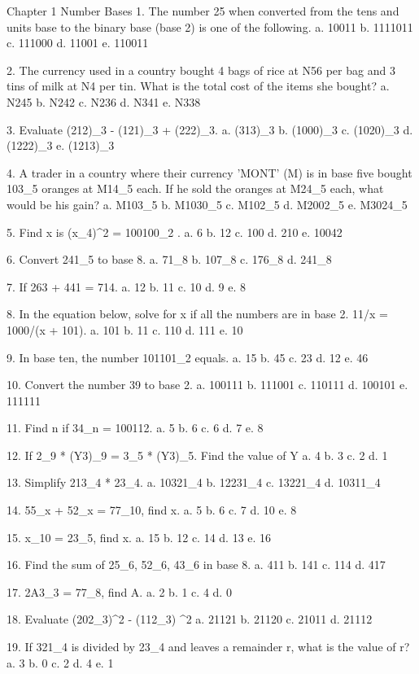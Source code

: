 Chapter 1
Number Bases
1. The number 25 when converted from the tens and units base to the binary base (base 2) is one of the following. 
 a. 10011	b. 1111011	c. 111000	d. 11001	e. 110011

2. The currency used in a country bought 4 bags of rice at N56 per bag and 3 tins of milk at N4 per tin. What is the total cost of the items she bought? 
 a. N245	b. N242		c. N236		d. N341		e. N338

3. Evaluate (212)_3 - (121)_3 + (222)_3.
 a. (313)_3	b. (1000)_3	c. (1020)_3	d. (1222)_3	e. (1213)_3

4. A trader in a country where their currency 'MONT' (M) is in base five bought 103_5 oranges at M14_5 each. If he sold the oranges at M24_5 each, what would be his gain?
 a. M103_5	b. M1030_5	c. M102_5	d. M2002_5	e. M3024_5

5. Find x is (x_4)^2 = 100100_2 .
 a. 6	b. 12	c. 100	d. 210	e. 10042

6. Convert 241_5 to base 8.
 a. 71_8	b. 107_8	c. 176_8	d. 241_8

7. If 263 + 441 = 714. 
 a. 12	b. 11	c. 10	d. 9	e. 8

8. In the equation below, solve for x if all the numbers are in base 2. 11/x = 1000/(x + 101).  
 a. 101		b. 11		c. 110		d. 111		e. 10

9. In base ten, the number 101101_2 equals. 
 a. 15		b. 45		c. 23		d. 12		e. 46

10. Convert the number 39 to base 2.
 a. 100111	b. 111001	c. 110111	d. 100101	e. 111111

11. Find n if 34_n = 100112. 
 a. 5	b. 6	c. 6	d. 7	e. 8

12. If 2_9 * (Y3)_9 = 3_5 * (Y3)_5. Find the value of Y
 a. 4	b. 3	c. 2	d. 1

13. Simplify 213_4 * 23_4. 
 a. 10321_4	b. 12231_4	c. 13221_4	d. 10311_4

14. 55_x + 52_x = 77_10, find x. 
 a. 5	b. 6	c. 7	d. 10	e. 8

15. x_10 = 23_5, find x. 
 a. 15	b. 12	c. 14	d. 13	e. 16

16. Find the sum of 25_6, 52_6, 43_6 in base 8.
 a. 411		b. 141		c. 114		d. 417

17. 2A3_3 = 77_8, find A. 
 a. 2	b. 1	c. 4	d. 0

18. Evaluate (202_3)^2 - (112_3) ^2
 a. 21121	b. 21120	c. 21011	d. 21112

19. If 321_4 is divided by 23_4 and leaves a remainder r, what is the value of r? 
 a. 3	b. 0	c. 2	d. 4	e. 1

